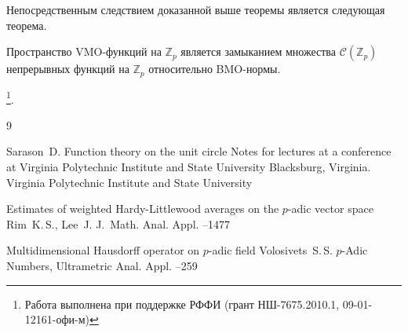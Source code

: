 \smallskip

Непосредственным следствием доказанной выше теоремы является следующая теорема.

\smallskip

\begin{theorem}[2]
Пространство VMO-функций на $\mathbb Z_p$ является замыканием
множества $\mathcal C\left(\mathbb Z_p\right)$ непрерывных функций
на $\mathbb Z_p$ относительно BMO-нормы.
\end{theorem}

{\thanks{Работа выполнена при поддержке РФФИ (грант НШ-7675.2010.1, 09-01-12161-офи-м)}.}

\begin{thebibliography}{9}

 \by Sarason~D. 
\book Function theory on the unit circle
\bookinfo Notes for lectures at a conference at Virginia Polytechnic Institute and State University
 \publaddr Blacksburg, Virginia. \publ Virginia Polytechnic Institute and State University 
  

\paper Estimates of weighted Hardy-Littlewood averages on the $p$-adic vector space
\by Rim~K.\,S., Lee~J.
\jour J.~Math. Anal. Appl.
--1477

\paper Multidimensional Hausdorff operator on $p$-adic field
\by    Volosivets~S.\,S.
\jour $p$-Adic Numbers, Ultrametric Anal. Appl.
--259

\end{thebibliography}

%

\makeengtitlem

\renewcommand{\baselinestretch}{0.9}

\newpage 


%

